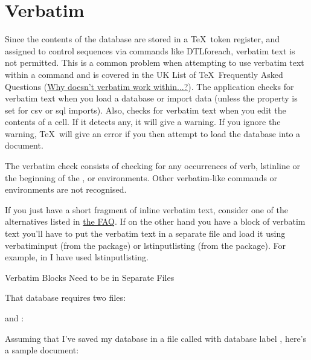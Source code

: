 \section{Verbatim}
\label{sec:verbatim}

Since the contents of the database are stored in a \TeX\ token
register, and assigned to control sequences via commands like
\gls{DTLforeach}, verbatim text is not permitted. This is 
a common problem when attempting to use verbatim text within
a command and is covered in the UK List of \TeX\ Frequently
Asked Questions (\href{https://texfaq.org/FAQ-verbwithin}{Why doesn't verbatim work within...?}).
The  application checks for verbatim text when you load a database or import
data (unless the  property is set for
\gls{csv} or \gls{sql} imports). Also,  checks for
verbatim text when you edit the contents of a cell. If it
detects any, it will give a warning. If you ignore the warning, 
\TeX\ will give an error if you then attempt to load the database into
a document.

\begin{information}
The verbatim check consists of checking for any occurrences of
\gls{verb}, \gls{lstinline} or the beginning of the ,
 or  environments. Other verbatim-like
commands or environments are not recognised.
\end{information}

If you just have a short fragment of inline verbatim text, consider
one of the alternatives listed in \href{https://texfaq.org/FAQ-verbwithin}{the FAQ}.
If on the other hand you have a block of verbatim text you'll have 
to put the verbatim text in a separate file
and load it using \gls{verbatiminput} (from the 
 package) or \gls{lstinputlisting} (from the
 package). For example, in  
I have used \gls{lstinputlisting}.

{%
}
{Verbatim Blocks Need to be in Separate Files}

That database requires two files: 

and :


Assuming that I've saved my database in a file called
 with database label ,
here's a sample document:


